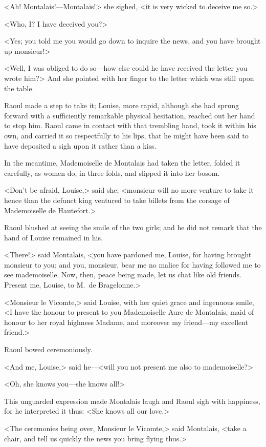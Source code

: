 <Ah! Montalais!—Montalais!> she sighed, <it is very wicked to deceive me so.>

<Who, I\@? I have deceived you?>

<Yes; you told me you would go down to inquire the news, and you have brought up monsieur!>

<Well, I was obliged to do so—how else could he have received the letter you wrote him?> And she pointed with her finger to the letter which was still upon the table.

Raoul made a step to take it; Louise, more rapid, although she had sprung forward with a sufficiently remarkable physical hesitation, reached out her hand to stop him. Raoul came in contact with that trembling hand, took it within his own, and carried it so respectfully to his lips, that he might have been said to have deposited a sigh upon it rather than a kiss.

In the meantime, Mademoiselle de Montalais had taken the letter, folded it carefully, as women do, in three folds, and slipped it into her bosom.

<Don't be afraid, Louise,> said she; <monsieur will no more venture to take it hence than the defunct king  ventured to take billets from the corsage of Mademoiselle de Hautefort.>

Raoul blushed at seeing the smile of the two girls; and he did not remark that the hand of Louise remained in his.

<There!> said Montalais, <you have pardoned me, Louise, for having brought monsieur to you; and you, monsieur, bear me no malice for having followed me to see mademoiselle. Now, then, peace being made, let us chat like old friends. Present me, Louise, to M.~de Bragelonne.>

<Monsieur le Vicomte,> said Louise, with her quiet grace and ingenuous smile, <I have the honour to present to you Mademoiselle Aure de Montalais, maid of honour to her royal highness Madame, and moreover my friend—my excellent friend.>

Raoul bowed ceremoniously.

<And me, Louise,> said he—<will you not present me also to mademoiselle?>

<Oh, she knows you—she knows all!>

This unguarded expression made Montalais laugh and Raoul sigh with happiness, for he interpreted it thus: <She knows all our love.>

<The ceremonies being over, Monsieur le Vicomte,> said Montalais, <take a chair, and tell us quickly the news you bring flying thus.>

